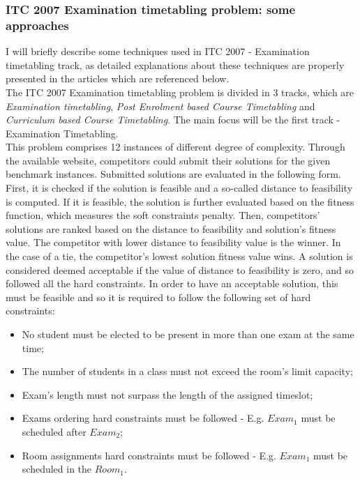\subsubsection{ITC 2007 Examination timetabling problem: some approaches}
\label{subsection:ApprITC2007}

I will briefly describe some techniques used in ITC 2007 - Examination timetabling track, as detailed explanations about these techniques are properly presented in the articles which are referenced below.
\\
The ITC 2007 Examination timetabling problem is divided in 3 tracks, which are \textit{Examination timetabling}, \textit{Post Enrolment based Course Timetabling} and \textit{Curriculum based Course Timetabling}. The main focus will be the first track - Examination Timetabling.
\\
This problem comprises 12 instances of different degree of complexity. Through the available website, competitors could submit their solutions for the given benchmark instances. Submitted solutions are evaluated in the following form. First, it is checked if the solution is feasible and a so-called distance to feasibility is computed. If it is feasible, the solution is further evaluated based on the fitness function, which measures the soft constraints penalty. Then, competitors' solutions are ranked based on the distance to feasibility and solution's fitness value. The competitor with lower distance to feasibility value is the winner. In the case of a tie, the competitor's lowest solution fitness value wins. A solution is considered deemed acceptable if the value of distance to feasibility is zero, and so followed all the hard constraints. In order to have an acceptable solution, this must be feasible and so it is required to follow the following set of hard constraints:
\begin{itemize}
	\item No student must be elected to be present in more than one exam at the same time;
	\item The number of students in a class must not exceed the room's limit capacity;
	\item Exam's length must not surpass the length of the assigned timeslot;
	\item Exams ordering hard constraints must be followed - E.g. $Exam_1$ must be scheduled after $Exam_2$;
	\item Room assignments hard constraints must be followed - E.g. 	$Exam_1$ must be scheduled in the $Room_1$.
\end{itemize}

